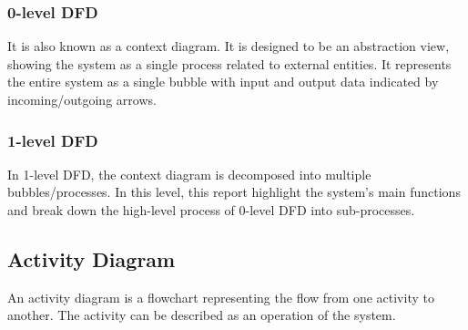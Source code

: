 \documentclass[a4paper,12pt]{report}
\begin{document}
\subsubsection{0-level DFD}
It is also known as a context diagram. It is designed to be an abstraction view, showing the system as a single process related to external entities. It represents the entire system as a single bubble with input and output data indicated by incoming/outgoing arrows.
\subsubsection{1-level DFD}
In 1-level DFD, the context diagram is decomposed into multiple bubbles/processes. In this level, this report highlight the system's main functions and break down the high-level process of 0-level DFD into sub-processes.
\subsection{Activity Diagram}
An activity diagram is a flowchart representing the flow from one activity to another. The activity can be described as an operation of the system.

\end{document}

